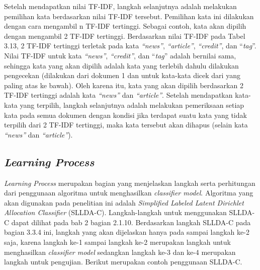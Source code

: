 \indent
Setelah mendapatkan nilai TF-IDF, langkah selanjutnya adalah melakukan pemilihan kata berdasarkan nilai TF-IDF tersebut. Pemilihan kata ini dilakukan dengan cara mengambil n TF-IDF tertinggi. Sebagai contoh, kata akan dipilih dengan mengambil 2 TF-IDF tertinggi. Berdasarkan nilai TF-IDF pada Tabel 3.13, 2 TF-IDF tertinggi terletak pada kata {\itshape “news”}, {\itshape “article”}, {\itshape “credit”}, dan “{\itshape tag}”. Nilai TF-IDF untuk kata {\itshape “news”}, {\itshape “credit”}, dan “{\itshape tag}” adalah bernilai sama, sehingga kata yang akan dipilih adalah kata yang terlebih dahulu dilakukan pengecekan (dilakukan dari dokumen 1 dan untuk kata-kata dicek dari yang paling atas ke bawah). Oleh karena itu, kata yang akan dipilih berdasarkan 2 TF-IDF tertinggi adalah kata {\itshape “news”} dan {\itshape “article”}. Setelah mendapatkan kata-kata yang terpilih, langkah selanjutnya adalah melakukan pemeriksaan setiap kata pada semua dokumen dengan kondisi jika terdapat suatu kata yang tidak terpilih dari 2 TF-IDF tertinggi, maka kata tersebut akan dihapus (selain kata {\itshape “news”} dan {\itshape “article”}).

\subsection{{\itshape Learning Process}}
\indent
{\itshape Learning Process} merupakan bagian yang menjelaskan langkah serta perhitungan dari penggunaan algoritma untuk menghasilkan {\itshape classifier model}. Algoritma yang akan digunakan pada penelitian ini adalah {\itshape Simplified Labeled Latent Dirichlet Allocation Classifier} (SLLDA-C). Langkah-langkah untuk menggunakan SLLDA-C dapat dilihat pada bab 2 bagian 2.1.10. Berdasarkan langkah SLLDA-C pada bagian 3.3.4 ini, langkah yang akan dijelaskan hanya pada sampai langkah ke-2 saja, karena langkah ke-1 sampai langkah ke-2 merupakan langkah untuk menghasilkan {\itshape classifier model} sedangkan langkah ke-3 dan ke-4 merupakan langkah untuk pengujian. Berikut merupakan contoh penggunaan SLLDA-C.

